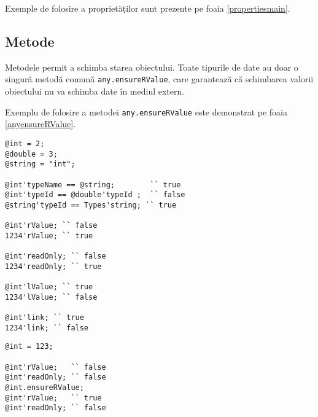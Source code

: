 Exemple de folosire a proprietăților sunt prezente pe foaia \ref{propertiesmain}.

\subsection{Metode}

Metodele permit a schimba starea obiectului. Toate tipurile de date au doar o singură metodă comună \texttt{any.ensureRValue}, care garantează că schimbarea valorii obiectului nu va schimba date în mediul extern.

Exemplu de folosire a metodei \texttt{any.ensureRValue} este demonstrat pe foaia \ref{anyensureRValue}.

\newpage
\begin{sourcecode}
\label{propertiesmain}
\begin{verbatim}
@int = 2;
@double = 3;
@string = "int";

@int'typeName == @string;		 `` true
@int'typeId == @double'typeId ;	 `` false
@string'typeId == Types'string; `` true

@int'rValue; `` false
1234'rValue; `` true

@int'readOnly; `` false
1234'readOnly; `` true

@int'lValue; `` true
1234'lValue; `` false

@int'link; `` true
1234'link; `` false
\end{verbatim}
\end{sourcecode}


\begin{sourcecode}
\label{anyensureRValue}
\begin{verbatim}
@int = 123;

@int'rValue;   `` false
@int'readOnly; `` false
@int.ensureRValue;
@int'rValue;   `` true
@int'readOnly; `` false
\end{verbatim}
\end{sourcecode}